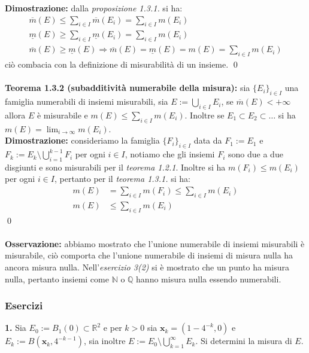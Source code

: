 \documentclass{article}
\numberwithin{equation}{subsection}
\begin{document}
\textbf{Dimostrazione:} dalla \textit{proposizione 1.3.1.} si ha:
\begin{gather*}
    \overline{m}(E) \leq \sum_{i \in I} \overline{m}(E_i) = \sum_{i \in I} m(E_i)  \\
    \underline{m}(E) \geq \sum_{i \in I} \underline{m}(E_i) = \sum_{i \in I} m(E_i)  \\
    \overline{m}(E) \geq \underline{m}(E) \Rightarrow \overline{m}(E) = \underline{m}(E) = m(E) = \sum_{i \in I} m(E_i) 
\end{gather*}
ciò combacia con la definizione di misurabilità di un insieme. \qed \\ \\
\textbf{Teorema 1.3.2 (subadditività numerabile della misura):} sia $\{ E_i \}_{i \in I}$ una famiglia numerabili di insiemi misurabili, sia $E := \bigcup_{i \in I} E_i$, se $\overline{m}(E) < + \infty$ allora $E$ è misurabile e $m(E) \leq \sum_{i \in I} m(E_i)$. Inoltre se $E_1 \subset E_2 \subset \dots$ si ha $m(E) = \lim_{i \rightarrow \infty} m(E_i)$. \\

\textbf{Dimostrazione:} consideriamo la famiglia $\{ F_i \}_{i \in I}$ data da $F_1 := E_1$ e $F_k := E_k \setminus \bigcup_{i = 1}^{k - 1} F_i$ per ogni $i \in I$, notiamo che gli insiemi $F_i$ sono due a due disgiunti e sono misurabili per il \textit{teorema 1.2.1}. Inoltre si ha $m(F_i) \leq m(E_i)$ per ogni $i \in I$, pertanto per il \textit{teorema 1.3.1.} si ha:
\begin{align*}
    m(E) &= \sum_{i \in I} m(F_i) \leq \sum_{i \in I} m(E_i)  \\
    m(E) &\leq \sum_{i \in I} m(E_i) 
\end{align*} \qed
\\ \\
\textbf{Osservazione:} abbiamo mostrato che l'unione numerabile di insiemi misurabili è misurabile, ciò comporta che l'unione numerabile di insiemi di misura nulla ha ancora misura nulla. Nell'\textit{esercizio 3(2)} si è mostrato che un punto ha misura nulla, pertanto insiemi come $\mathbb{N}$ o $\mathbb{Q}$ hanno misura nulla essendo numerabili.
\subsubsection{Esercizi}
\textbf{1.} Sia $E_0 := B_1(0) \subset \mathbb{R}^2$ e per $k > 0$ sia $\mathbf{x}_k = (1 - 4^{-k}, 0)$ e $E_k := B(\mathbf{x}_k, 4^{-k-1})$, sia inoltre $E := E_0 \setminus \bigcup_{k = 1}^\infty E_k$. Si determini la misura di $E$. \\
\end{document}
